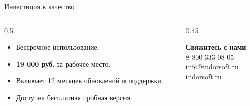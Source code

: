 \documentclass[aspectratio=169]{beamer}
\begin{document}
\begin{frame}{Инвестиция в качество}
    \begin{columns}
        \begin{column}{0.5\textwidth}
            \begin{roundbox}[Лицензирование]
                \begin{itemize}
                    \item Бессрочное использование.
                    \item \textcolor{AccentCyan}{\textbf{19 000 руб.}} за рабочее место.
                    \item Включает 12 месяцев обновлений и поддержки.
                    \item Доступна бесплатная пробная версия.
                \end{itemize}
            \end{roundbox}
        \end{column}
        \begin{column}{0.45\textwidth}
            \begin{simplebox}
                \centering
                \textbf{Свяжитесь с нами}\\[0.3cm]
                \textcolor{AccentCyan}{8 800 333-08-05}\\[0.2cm]
                \textcolor{TextHighlight}{info@indorsoft.ru}\\[0.2cm]
                indorsoft.ru
            \end{simplebox}
        \end{column}
    \end{columns}
\end{frame}
\end{document}
